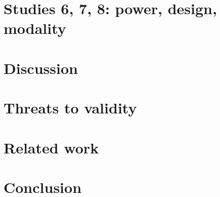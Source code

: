 \documentclass[letterpaper]{article}
\begin{document}
\section{Studies 6, 7, 8: power, design, modality}
%

\section{Discussion}

\section{Threats to validity}

\section{Related work}

\section{Conclusion}



\end{document}
